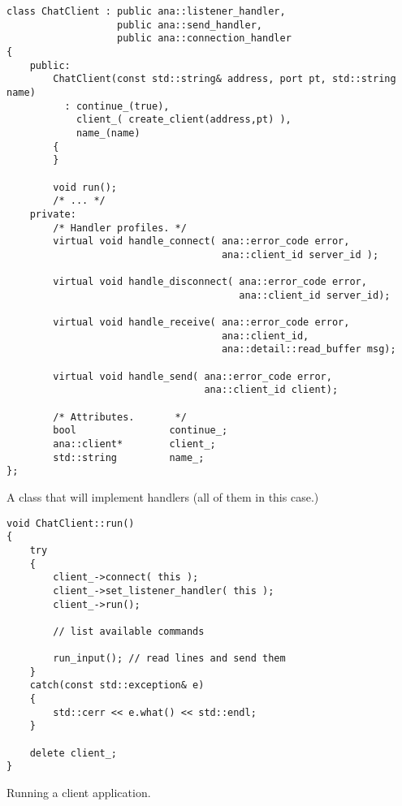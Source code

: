 \documentclass[a4paper,12pt,english]{article}
\begin{document}
\begin{table}[!htb]
\lstset{language=C++}
\begin{lstlisting}[frame=single]
class ChatClient : public ana::listener_handler,
                   public ana::send_handler,
                   public ana::connection_handler
{
    public:
        ChatClient(const std::string& address, port pt, std::string name)
          : continue_(true),
            client_( create_client(address,pt) ),
            name_(name)
        {
        }
        
        void run();
        /* ... */
    private:
        /* Handler profiles. */
        virtual void handle_connect( ana::error_code error, 
                                     ana::client_id server_id );

        virtual void handle_disconnect( ana::error_code error, 
                                        ana::client_id server_id);

        virtual void handle_receive( ana::error_code error, 
                                     ana::client_id, 
                                     ana::detail::read_buffer msg);

        virtual void handle_send( ana::error_code error, 
                                  ana::client_id client);

        /* Attributes.       */
        bool                continue_;
        ana::client*        client_;
        std::string         name_;
};
\end{lstlisting}
\centering \caption{A class that will implement handlers (all of them in this case.)} 
\label{chatclient-decl}
\end{table}

\begin{table}[!htb]
\lstset{language=C++}
\begin{lstlisting}[frame=single]
void ChatClient::run()
{
    try
    {
        client_->connect( this );
        client_->set_listener_handler( this );
        client_->run();

        // list available commands

        run_input(); // read lines and send them
    }
    catch(const std::exception& e)
    {
        std::cerr << e.what() << std::endl;
    }

    delete client_;
}
\end{lstlisting}
\centering \caption{Running a client application.} 
\label{client-run}
\end{table}
\end{document}

